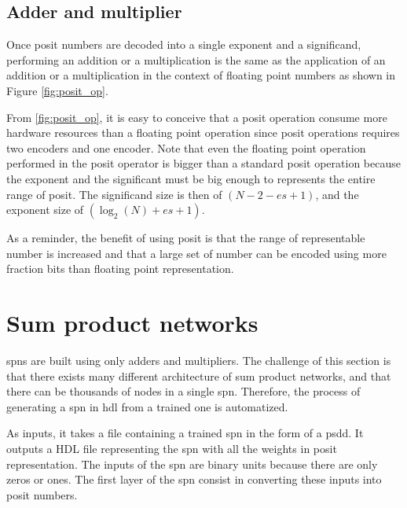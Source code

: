 \subsection{Adder and multiplier}
Once posit numbers are decoded into a single exponent and a significand, performing an addition or a multiplication is the same as the application of an addition or a multiplication in the context of floating point numbers as shown in Figure \ref{fig:posit_op}.

From \ref{fig:posit_op}, it is easy to conceive that a posit operation consume more hardware resources than a floating point operation since posit operations requires two encoders and one encoder. Note that even the floating point operation performed in the posit operator is bigger than a standard posit operation because the exponent and the significant must be big enough to represents the entire range of posit. The significand size is then of $(N-2-es+1)$, and the exponent size of $(\log_2(N)+es+1)$.

As a reminder, the benefit of using posit is that the range of representable number is increased and that a large set of number can be encoded using more fraction bits than floating point representation.


\section{Sum product networks}

\Glspl{spn} are built using only adders and multipliers. The challenge of this section is that there exists many different architecture of sum product networks, and that there can be thousands of nodes in a single \gls{spn}. Therefore, the process of generating a \gls{spn} in \gls{hdl} from a trained one is automatized.

As inputs, it takes a file containing a trained \gls{spn} in the form of a \gls{psdd}. It outputs a HDL file representing the \gls{spn} with all the weights in posit representation. The inputs of the \gls{spn} are binary units because there are only zeros or ones. The first layer of the \gls{spn} consist in converting these inputs into posit numbers.

